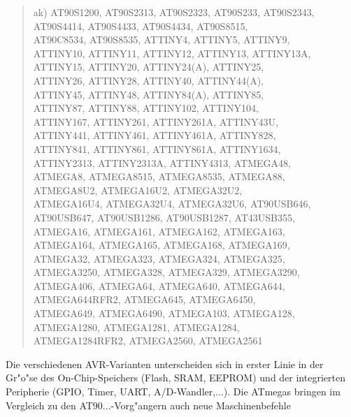 \documentclass[12pt,a4paper,twoside]{report}
\begin{document}
\begin{quote}
ak) AT90S1200, AT90S2313, AT90S2323, AT90S233, AT90S2343,\\
    AT90S4414, AT90S4433, AT90S4434, AT90S8515,\\
    AT90C8534, AT90S8535, ATTINY4, ATTINY5, ATTINY9,\\
    ATTINY10, ATTINY11, ATTINY12, ATTINY13, ATTINY13A,\\
    ATTINY15, ATTINY20, ATTINY24(A), ATTINY25,\\
    ATTINY26, ATTINY28, ATTINY40, ATTINY44(A),\\
    ATTINY45, ATTINY48, ATTINY84(A), ATTINY85,\\
    ATTINY87, ATTINY88, ATTINY102, ATTINY104,\\
    ATTINY167, ATTINY261, ATTINY261A, ATTINY43U,\\
    ATTINY441, ATTINY461, ATTINY461A, ATTINY828,\\
    ATTINY841, ATTINY861, ATTINY861A, ATTINY1634,\\
    ATTINY2313, ATTINY2313A, ATTINY4313, ATMEGA48,\\
    ATMEGA8, ATMEGA8515, ATMEGA8535, ATMEGA88,\\
    ATMEGA8U2, ATMEGA16U2, ATMEGA32U2,\\
    ATMEGA16U4, ATMEGA32U4, ATMEGA32U6, AT90USB646,\\
    AT90USB647, AT90USB1286, AT90USB1287, AT43USB355,\\
    ATMEGA16, ATMEGA161, ATMEGA162, ATMEGA163,\\
    ATMEGA164, ATMEGA165, ATMEGA168, ATMEGA169,\\
    ATMEGA32, ATMEGA323, ATMEGA324, ATMEGA325,\\
    ATMEGA3250, ATMEGA328, ATMEGA329, ATMEGA3290,\\
    ATMEGA406, ATMEGA64, ATMEGA640, ATMEGA644,\\
    ATMEGA644RFR2, ATMEGA645, ATMEGA6450,\\
    ATMEGA649, ATMEGA6490, ATMEGA103, ATMEGA128,\\
    ATMEGA1280, ATMEGA1281, ATMEGA1284,\\
    ATMEGA1284RFR2, ATMEGA2560, ATMEGA2561
\end{quote}
Die verschiedenen AVR-Varianten unterscheiden sich in erster Linie in
der Gr"o"se des On-Chip-Speichers (Flash, SRAM, EEPROM) und der integrierten
Peripherie (GPIO, Timer, UART, A/D-Wandler,...).  Die ATmegas bringen im
Vergleich zu den AT90...-Vorg"angern auch neue Maschinenbefehle
\end{document}
